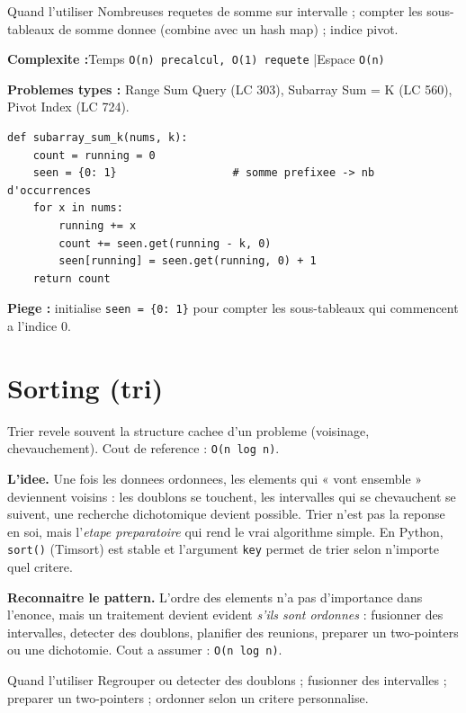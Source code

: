 \documentclass[11pt,a4paper]{article}
\newcommand{\complexite}[2]{%
  \noindent\textbf{Complexite :}\quad Temps \texttt{#1} \quad|\quad Espace \texttt{#2}\par\smallskip}
\newcommand{\leetcode}[1]{\noindent\textbf{Problemes types :} #1\par\medskip}
\begin{document}
\begin{infobox}{Quand l'utiliser}
Nombreuses requetes de somme sur intervalle ; compter les sous-tableaux de somme
donnee (combine avec un hash map) ; indice pivot.
\end{infobox}

\complexite{O(n) precalcul, O(1) requete}{O(n)}
\leetcode{Range Sum Query (LC 303), Subarray Sum = K (LC 560), Pivot Index (LC 724).}

\begin{lstlisting}
def subarray_sum_k(nums, k):
    count = running = 0
    seen = {0: 1}                  # somme prefixee -> nb d'occurrences
    for x in nums:
        running += x
        count += seen.get(running - k, 0)
        seen[running] = seen.get(running, 0) + 1
    return count
\end{lstlisting}

\textbf{Piege :} initialise \texttt{seen = \{0: 1\}} pour compter les
sous-tableaux qui commencent a l'indice 0.

\section{Sorting (tri)}
Trier revele souvent la structure cachee d'un probleme (voisinage, chevauchement).
Cout de reference : \texttt{O(n log n)}.

\textbf{L'idee.} Une fois les donnees ordonnees, les elements qui « vont
ensemble » deviennent voisins : les doublons se touchent, les intervalles qui se
chevauchent se suivent, une recherche dichotomique devient possible. Trier n'est
pas la reponse en soi, mais l'\emph{etape preparatoire} qui rend le vrai
algorithme simple. En Python, \texttt{sort()} (Timsort) est stable et l'argument
\texttt{key} permet de trier selon n'importe quel critere.

\textbf{Reconnaitre le pattern.} L'ordre des elements n'a pas d'importance dans
l'enonce, mais un traitement devient evident \emph{s'ils sont ordonnes} :
fusionner des intervalles, detecter des doublons, planifier des reunions,
preparer un two-pointers ou une dichotomie. Cout a assumer : \texttt{O(n log n)}.

\begin{infobox}{Quand l'utiliser}
Regrouper ou detecter des doublons ; fusionner des intervalles ; preparer un
two-pointers ; ordonner selon un critere personnalise.
\end{infobox}
\end{document}
